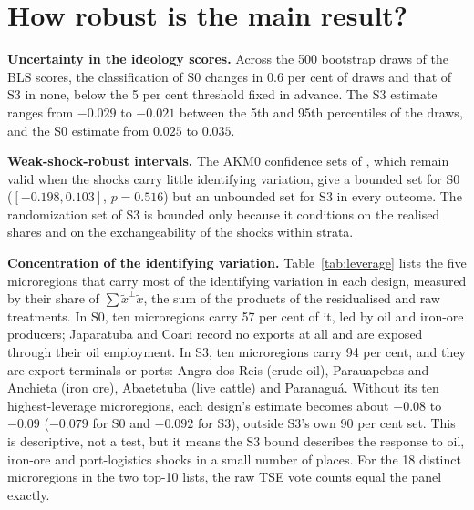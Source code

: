 \documentclass[
	11pt,				%
	oneside,			%
	a4paper,			%
	english,			%
	english				%
	]{abntex2ppgsi}
\theoremstyle{plain}
\theoremstyle{remark}
\theoremstyle{plain}%
\theoremstyle{remark}%
\begin{document}
\section{How robust is the main result?}
\label{sec:main-robust}

\textbf{Uncertainty in the ideology scores.} Across the 500 bootstrap draws of the BLS scores, the classification of S0 changes in 0.6 per cent of draws and that of S3 in none, below the 5 per cent threshold fixed in advance. The S3 estimate ranges from $-0.029$ to $-0.021$ between the 5th and 95th percentiles of the draws, and the S0 estimate from $0.025$ to $0.035$.

\textbf{Weak-shock-robust intervals.} The AKM0 confidence sets of , which remain valid when the shocks carry little identifying variation, give a bounded set for S0 ($[-0.198, 0.103]$, $p = 0.516$) but an unbounded set for S3 in every outcome. The randomization set of S3 is bounded only because it conditions on the realised shares and on the exchangeability of the shocks within strata.

\textbf{Concentration of the identifying variation.} Table~\ref{tab:leverage} lists the five microregions that carry most of the identifying variation in each design, measured by their share of $\sum \tilde{x}^{\perp}\tilde{x}$, the sum of the products of the residualised and raw treatments. In S0, ten microregions carry 57 per cent of it, led by oil and iron-ore producers; Japaratuba and Coari record no exports at all and are exposed through their oil employment. In S3, ten microregions carry 94 per cent, and they are export terminals or ports: Angra dos Reis (crude oil), Parauapebas and Anchieta (iron ore), Abaetetuba (live cattle) and Paranaguá. Without its ten highest-leverage microregions, each design's estimate becomes about $-0.08$ to $-0.09$ ($-0.079$ for S0 and $-0.092$ for S3), outside S3's own 90 per cent set. This is descriptive, not a test, but it means the S3 bound describes the response to oil, iron-ore and port-logistics shocks in a small number of places. For the 18 distinct microregions in the two top-10 lists, the raw TSE vote counts equal the panel exactly.
\end{document}
